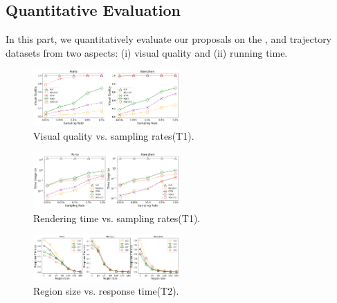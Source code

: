 \subsection{Quantitative Evaluation}\label{sec:quality}
In this part, we quantitatively evaluate our proposals on the \pt{}, \cd{} and \sz{} trajectory datasets from two aspects:
(i) visual quality and (ii) running time.

\begin{figure}[t]
	\centering
	\includegraphics[width=0.5\textwidth]{pictures/quantitative_study_icde/rate_quality.png}
	\vspace{-8mm}
	\caption{Visual quality vs. sampling rates(T1).}
	\label{fig:sample_quality}
	\vspace{-3mm}
\end{figure}

\begin{figure}[t]
	\centering
	\includegraphics[width=0.5\textwidth]{pictures/quantitative_study_icde/rate_rendertime.png}
	\vspace{-8mm}
	\caption{Rendering time vs. sampling rates(T1).}
	\label{fig:rate_quality}
	\vspace{-3mm}
\end{figure}


\begin{figure}[t]
	\centering
	\includegraphics[width=0.5\textwidth]{pictures/quantitative_study_icde/size_rendertime.png}
	\vspace{-8mm}
	\caption{Region size vs. response time(T2).}
	\label{fig:size_rendertime}
	\vspace{-3mm}
\end{figure}

